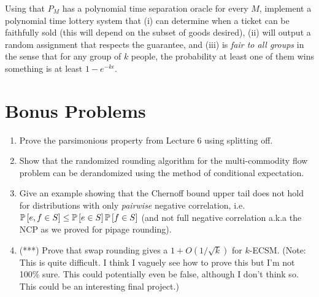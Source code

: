 Using that $P_M$ has a polynomial time separation oracle for every $M$, implement a polynomial time lottery system that (i) can determine when a ticket can be faithfully sold (this will depend on the subset of goods desired), (ii) will output a random assignment that respects the guarantee, and (iii) is \textit{fair to all groups} in the sense that for any group of $k$ people, the probability at least one of them wins something is at least $1-e^{-k\epsilon}$.

\section{Bonus Problems} 

\begin{enumerate}
	\item Prove the parsimonious property from Lecture 6 using splitting off. 
	\item Show that the randomized rounding algorithm for the multi-commodity flow problem can be derandomized using the method of conditional expectation.
	\item Give an example showing that the Chernoff bound upper tail does not hold for distributions with only \textit{pairwise} negative correlation, i.e. $\P{e,f \in S} \le \P{e \in S}\P{f \in S}$ (and not full negative correlation a.k.a the NCP as we proved for pipage rounding). 
	\item (***) Prove that swap rounding gives a $1+O(1/\sqrt{k})$ for $k$-ECSM. (Note: This is quite difficult. I think I vaguely see how to prove this but I'm not 100\% sure. This could potentially even be false, although I don't think so. This could be an interesting final project.)
\end{enumerate}

